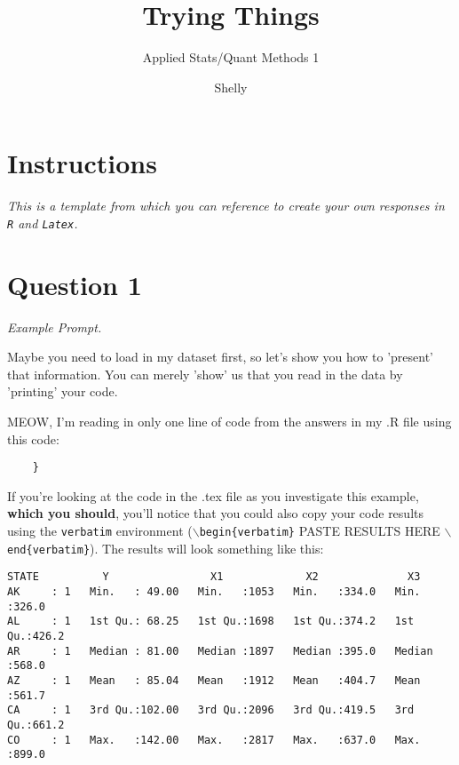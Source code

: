 \documentclass[12pt,letterpaper]{article}
\title{Trying Things}
\date{Shelly}
\author{Applied Stats/Quant Methods 1}
\begin{document}
	\maketitle
	
	\section*{Instructions}

 \textit{This is a template from which you can reference to create your own responses in \texttt{R} and \texttt{Latex}.}

\section*{Question 1 }

\textit{Example Prompt.}\\

\vspace{.25cm}

\noindent Maybe you need to load in my dataset first, so let's show you how to 'present' that information. You can merely 'show' us that you read in the data by 'printing' your code. \\

  

\vspace{.25cm}

\noindent MEOW, I'm reading in only one line of code from the answers in my .R file using this code: 

\begin{verbatim}
	}
\end{verbatim}

\noindent If you're looking at the code in the .tex file as you investigate this example, \textbf{which you should}, you'll notice that you could also copy your code results using the \texttt{verbatim} environment (\texttt{$\backslash$begin\{verbatim\}} PASTE RESULTS HERE \texttt{$\backslash$end\{verbatim\}}). The results will look something like this:


\begin{verbatim}
STATE          Y                X1             X2              X3       
AK     : 1   Min.   : 49.00   Min.   :1053   Min.   :334.0   Min.   :326.0  
AL     : 1   1st Qu.: 68.25   1st Qu.:1698   1st Qu.:374.2   1st Qu.:426.2  
AR     : 1   Median : 81.00   Median :1897   Median :395.0   Median :568.0  
AZ     : 1   Mean   : 85.04   Mean   :1912   Mean   :404.7   Mean   :561.7  
CA     : 1   3rd Qu.:102.00   3rd Qu.:2096   3rd Qu.:419.5   3rd Qu.:661.2  
CO     : 1   Max.   :142.00   Max.   :2817   Max.   :637.0   Max.   :899.0  
\end{verbatim}
\vspace{.5cm}
\end{document}
